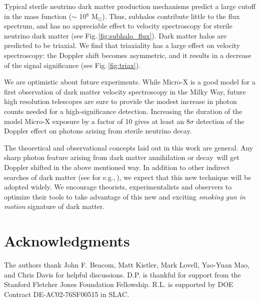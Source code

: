 \documentclass[aps,prd,10pt,twocolumn,superscriptaddress,showpacs,footinbib]{revtex4-1}
\begin{document}
Typical sterile neutrino dark matter production mechanisms predict a large cutoff in the mass function ($\sim$ 10$^8$ M$_\odot$).  Thus, subhalos contribute little to the flux spectrum, and has no appreciable effect to velocity spectroscopy for sterile neutrino dark matter (see Fig.\,\ref{fig:subhalo_flux}).  Dark matter halos are predicted to be triaxial.  We find that triaxiality has a large effect on velocity spectroscopy: the Doppler shift becomes asymmetric, and it results in a decrease of the signal significance (see Fig.\,\ref{fig:triax}).

We are optimistic about future experiments. While Micro-X is a good model for a first observation of dark matter velocity
spectroscopy in the Milky Way, future high resolution telescopes are sure to provide the
modest increase in photon counts needed for a high-significance detection. Increasing the duration
of the model Micro-X exposure by a factor of 10 gives at least an $8\sigma$ detection of the Doppler
effect on photons arising from sterile neutrino decay.

The theoretical and
observational concepts laid out in this work are general.  Any sharp photon feature arising from dark matter annihilation or decay\,\cite{Boddy:2015efa,Ibarra:2013eda} will get Doppler shifted in the above mentioned way.  In addition to other indirect searches of dark matter (see for e.g.,\,\cite{Yuksel:2007dr,Dasgupta:2012bd,Laha:2012fg,Ng:2013xha,Murase:2015gea,Chowdhury:2016bxs}), we expect that this new technique will be adopted widely.  We encourage theorists, experimentalists and observers to optimize their tools to take advantage of this new and exciting {\it smoking gun in motion} signature of dark matter.  

 
	

\section*{Acknowledgments} 

The authors thank John F. Beacom, Matt Kistler, Mark Lovell, Yao-Yuan Mao, and Chris Davis for helpful discussions. D.P. is
thankful for support from the Stanford Fletcher Jones Foundation Fellowship.  R.L. is supported by DOE Contract DE-AC02-76SF00515 in SLAC.


\newcommand{\mnras}[0]{M.N.R.A.S.}
%
%	
	
\end{document}
